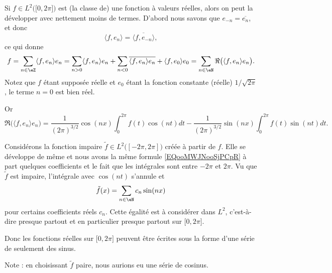 \begin{example}     \label{EXooQDWUooLtuIOm}
	Si \( f\in L^2\big( \mathopen[ 0 , 2\pi \mathclose] \big)\) est (la classe de) une fonction à valeurs réelles, alors on peut la développer avec nettement moins de termes. D'abord nous savons que \( e_{-n}=\overline{ e_n }\), et donc
	\begin{equation}
		\langle f, e_n\rangle =\overline{ \langle f, e_{-n}\rangle  },
	\end{equation}
	ce qui donne
	\begin{equation}
		f=\sum_{n\in\eZ}\langle f, e_n\rangle e_n
		=\sum_{n>0}\langle f, e_n\rangle e_n +\sum_{n<0}\overline{ \langle f, e_n\rangle e_n }+\langle f, e_0 \rangle e_0
		=\sum_{n\in \eN}\Re\big( \langle f, e_n\rangle e_n \big).
	\end{equation}
	Notez que \( f\) étant supposée réelle et \( e_0\) étant la fonction constante (réelle) \( 1/\sqrt{ 2\pi }\), le terme \( n=0\) est bien réel.

	Or
	\begin{equation}        \label{EQooMWJNooSjPCpR}
		\Re\big( \langle f, e_n\rangle e_n \big)=\frac{1}{ (2\pi)^{3/2} }\cos(nx)\int_0^{2\pi}f(t)\cos(nt)dt-\frac{1}{ (2\pi)^{3/2} }\sin(nx)\int_0^{2\pi}f(t)\sin(nt)dt.
	\end{equation}

	Considérons la fonction impaire \( \tilde f\in L^2\big( [-2\pi,2\pi] \big)\) créée à partir de \( f\). Elle se développe de même et nous avons la même formule \eqref{EQooMWJNooSjPCpR} à part quelques coefficients et le fait que les intégrales sont entre \( -2\pi\) et \( 2\pi\). Vu que \( \tilde f\) est impaire, l'intégrale avec \( \cos(nt)\) s'annule et
	\begin{equation}
		\tilde f(x)=\sum_{n\in \eN}c_n\sin(nx)
	\end{equation}
	pour certains coefficients réels \( c_n\). Cette égalité est à considérer dans \( L^2\), c'est-à-dire presque partout et en particulier presque partout sur \( \mathopen[ 0 , 2\pi \mathclose]\).

	Donc les fonctions réelles sur \( \mathopen[ 0 , 2\pi \mathclose]\) peuvent être écrites sous la forme d'une série de seulement des sinus.

	Note : en choisissant \( \tilde f\) paire, nous aurions eu une série de cosinus.
\end{example}

